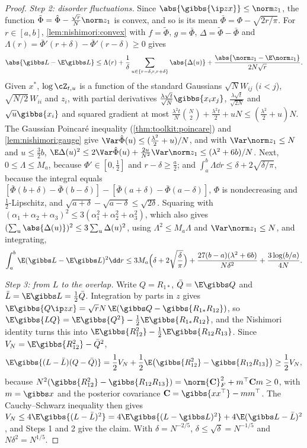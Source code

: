 \begin{refsection}
\begin{proof}
\emph{Step 2: disorder fluctuations.} Since $\abs{\gibbs{\ip zx}}\le\norm z_1$, the function $\tilde\Phi=\hat\Phi-\frac{\sqrt r}N\norm z_1$ is convex, and so is its mean $\bar\Phi=\Phi-\sqrt{2r/\pi}$. For $r\in[a,b]$, \cref{lem:nishimori:convex} with $f=\tilde\Phi$, $g=\bar\Phi$, $\Delta=\tilde\Phi-\bar\Phi$ and $\Lambda(r)=\bar\Phi'(r+\delta)-\bar\Phi'(r-\delta)\ge0$ gives
\[
\abs{\gibbs L-\E\gibbs L}\le\Lambda(r)+\frac1\delta\sum_{u\in\{r-\delta,r,r+\delta\}}\abs{\Delta(u)}+\frac{\abs{\norm z_1-\E\norm z_1}}{2N\sqrt r}.
\]
Given $x^*$, $\log\cZ_{t,u}$ is a function of the standard Gaussians $\sqrt NW_{ij}$ ($i<j$), $\sqrt{N/2}\,W_{ii}$ and $z_i$, with partial derivatives $\frac{\lambda\sqrt t}{\sqrt N}\gibbs{x_ix_j}$, $\frac{\lambda\sqrt t}{\sqrt{2N}}$ and $\sqrt u\gibbs{x_i}$ and squared gradient at most $\frac{\lambda^2t}N\binom N2+\frac{\lambda^2t}2+uN\le(\frac{\lambda^2}2+u)N$. The Gaussian Poincaré inequality (\cref{thm:toolkit:poincare}) and \cref{lem:nishimori:gauge} give $\Var\hat\Phi(u)\le(\frac{\lambda^2}2+u)/N$, and with $\Var\norm z_1\le N$ and $u\le\frac32b$, $\E\Delta(u)^2\le2\Var\hat\Phi(u)+\frac{2u}{N^2}\Var\norm z_1\le(\lambda^2+6b)/N$. Next, $0\le\Lambda\le M_a$, because $\Phi'\in[0,\frac12]$ and $r-\delta\ge\frac a2$; and $\int_a^b\Lambda\dd r\le\delta+2\sqrt{\delta/\pi}$, because the integral equals $[\bar\Phi(b+\delta)-\bar\Phi(b-\delta)]-[\bar\Phi(a+\delta)-\bar\Phi(a-\delta)]$, $\Phi$ is nondecreasing and $\frac12$-Lipschitz, and $\sqrt{a+\delta}-\sqrt{a-\delta}\le\sqrt{2\delta}$. Squaring with $(\alpha_1+\alpha_2+\alpha_3)^2\le3(\alpha_1^2+\alpha_2^2+\alpha_3^2)$, which also gives $(\sum_u\abs{\Delta(u)})^2\le3\sum_u\Delta(u)^2$, using $\Lambda^2\le M_a\Lambda$ and $\Var\norm z_1\le N$, and integrating,
\[
\int_a^b\E(\gibbs L-\E\gibbs L)^2\dd r\le3M_a\Bigl(\delta+2\sqrt{\frac\delta\pi}\Bigr)+\frac{27(b-a)(\lambda^2+6b)}{N\delta^2}+\frac{3\log(b/a)}{4N}.
\]

\emph{Step 3: from $L$ to the overlap.} Write $Q=R_{1*}$, $\bar Q=\E\gibbs Q$ and $\bar L=\E\gibbs L=\frac12\bar Q$. Integration by parts in $z$ gives $\E\gibbs{Q\ip zx}=\sqrt rN\,\E(\gibbs Q-\gibbs{R_{1*}R_{12}})$, so $\E\gibbs{LQ}=\E\gibbs{Q^2}-\frac12\E\gibbs{R_{1*}R_{12}}$, and the Nishimori identity turns this into $\E\gibbs{R_{12}^2}-\frac12\E\gibbs{R_{12}R_{13}}$. Since $V_N=\E\gibbs{R_{12}^2}-\bar Q^2$,
\[
\E\gibbs{(L-\bar L)(Q-\bar Q)}=\frac12V_N+\frac12\E\bigl(\gibbs{R_{12}^2}-\gibbs{R_{12}R_{13}}\bigr)\ge\frac12V_N,
\]
because $N^2(\gibbs{R_{12}^2}-\gibbs{R_{12}R_{13}})=\norm{\mathbf C}_F^2+m^\top\mathbf Cm\ge0$, with $m=\gibbs x$ and the posterior covariance $\mathbf C=\gibbs{xx^\top}-mm^\top$. The Cauchy--Schwarz inequality then gives $V_N\le4\E\gibbs{(L-\bar L)^2}=4\E\gibbs{(L-\gibbs L)^2}+4\E(\gibbs L-\bar L)^2$, and Steps 1 and 2 give the claim. With $\delta=N^{-2/5}$, $\delta\le\sqrt\delta=N^{-1/5}$ and $N\delta^2=N^{1/5}$.
\end{proof}


\end{refsection}
